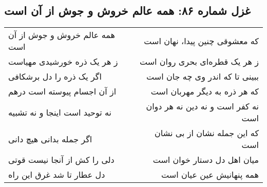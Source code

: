 \begin{center}
\section*{غزل شماره ۸۶: همه عالم خروش و جوش از آن است}
\label{sec:086}
\begin{longtable}{l p{0.5cm} r}
همه عالم خروش و جوش از آن است
&&
که معشوقی چنین پیدا، نهان است
\\
ز هر یک ذره خورشیدی مهیاست
&&
ز هر یک قطره‌ای بحری روان است
\\
اگر یک ذره را دل برشکافی
&&
ببینی تا که اندر وی چه جان است
\\
از آن اجسام پیوسته است درهم
&&
که هر ذره به دیگر مهربان است
\\
نه توحید است اینجا و نه تشبیه
&&
نه کفر است و نه دین نه هر دوان است
\\
اگر جمله بدانی هیچ دانی
&&
که این جمله نشان از بی نشان است
\\
دلی را کش از آنجا نیست قوتی
&&
میان اهل دل دستار خوان است
\\
دل عطار تا شد غرق این راه
&&
همه پنهانیش عین عیان است
\\
\end{longtable}
\end{center}
